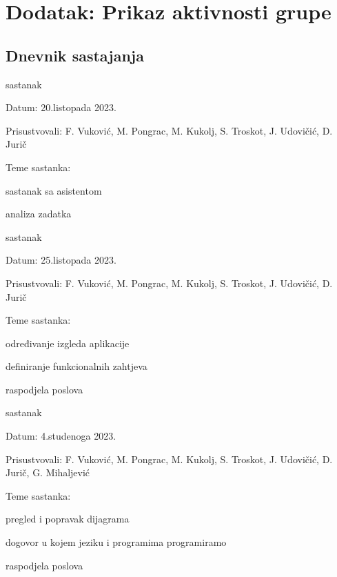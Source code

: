 \chapter*{Dodatak: Prikaz aktivnosti grupe}
		
		\section*{Dnevnik sastajanja}
						
		\begin{packed_enum}
			\item  sastanak
			
			\item[] \begin{packed_item}
				\item Datum: 20.listopada 2023.
				\item Prisustvovali: F. Vuković, M. Pongrac, M. Kukolj, S. Troskot, J. Udovičić, D. Jurič
				\item Teme sastanka:
				\begin{packed_item}
					\item  sastanak sa asistentom
					\item analiza zadatka
				\end{packed_item}
			\end{packed_item}

			\item  sastanak
			
			\item[] \begin{packed_item}
				\item Datum: 25.listopada 2023.
				\item Prisustvovali: F. Vuković, M. Pongrac, M. Kukolj, S. Troskot, J. Udovičić, D. Jurič
				\item Teme sastanka:
				\begin{packed_item}
					\item  određivanje izgleda aplikacije
					\item definiranje funkcionalnih zahtjeva
					\item raspodjela poslova 
				\end{packed_item}
			\end{packed_item}
			
			\item  sastanak
			\item[] \begin{packed_item}
				\item Datum: 4.studenoga 2023.
				\item Prisustvovali: F. Vuković, M. Pongrac, M. Kukolj, S. Troskot, J. Udovičić, D. Jurič, G. Mihaljević
				\item Teme sastanka:
				\begin{packed_item}
					\item  pregled i popravak dijagrama   
					\item  dogovor u kojem jeziku i programima programiramo 
					\item raspodjela poslova 
				\end{packed_item}
			\end{packed_item}


\end{packed_enum}
